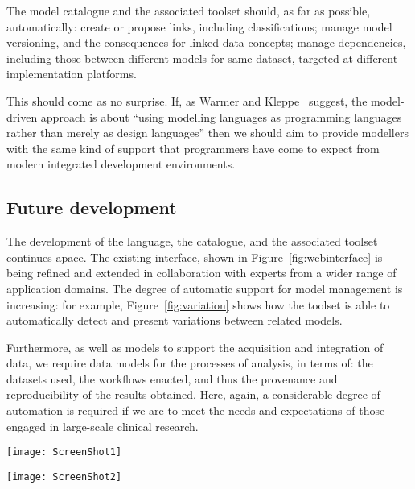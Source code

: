 The model catalogue and the associated toolset should, as
far as possible, automatically: create or propose links, including
classifications; manage model versioning, and the consequences for
linked data concepts; manage dependencies, including those between
different models for same dataset, targeted at different
implementation platforms.  

This should come as no surprise.  If, as Warmer and
Kleppe~\cite{MDAWarmer} suggest, the model-driven approach is about
``using modelling languages as programming languages rather than
merely as design languages'' then we should aim to provide modellers
with the same kind of support that programmers have come to expect
from modern integrated development environments.

\subsection{Future development}

The development of the language, the catalogue, and the associated
toolset continues apace.  The existing interface, shown in
Figure~\ref{fig:webinterface} is being refined and extended in
collaboration with experts from a wider range of application domains.
The degree of automatic support for model management is increasing:
for example, Figure~\ref{fig:variation} shows how the toolset is able
to automatically detect and present variations between related models.

Furthermore, as well as models to support the acquisition and
integration of data, we require data models for the processes of
analysis, in terms of: the datasets used, the workflows enacted, and
thus the provenance and reproducibility of the results obtained.
Here, again, a considerable degree of automation is required if we are
to meet the needs and expectations of those engaged in large-scale
clinical research. 

\clearpage

\begin{figure*}[h]
  \centering
  \texttt{[image: ScreenShot1]}
  \caption{web interface to the model catalogue}
  \label{fig:webinterface}
\end{figure*}

\begin{figure*}[h]
  \centering
  \texttt{[image: ScreenShot2]}  
  \caption{automatic detection of model variation}
  \label{fig:variation}
\end{figure*}

